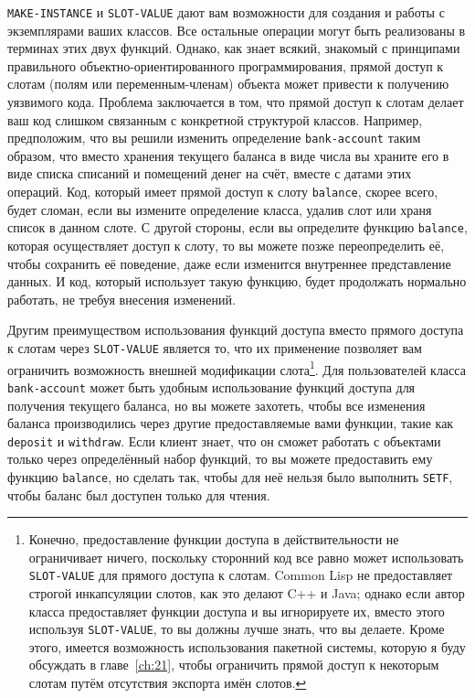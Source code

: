 \lstinline{MAKE-INSTANCE} и \lstinline{SLOT-VALUE} дают вам возможности для создания и работы с
экземплярами ваших классов.  Все остальные операции могут быть реализованы в терминах этих
двух функций.  Однако, как знает всякий, знакомый с принципами правильного
объектно-ориентированного программирования, прямой доступ к слотам (полям или
переменным-членам) объекта может привести к получению уязвимого кода.  Проблема
заключается в том, что прямой доступ к слотам делает ваш код слишком связанным с
конкретной структурой классов.  Например, предположим, что вы решили изменить определение
\lstinline{bank-account} таким образом, что вместо хранения текущего баланса в виде числа вы
храните его в виде списка списаний и помещений денег на счёт, вместе с датами этих
операций.  Код, который имеет прямой доступ к слоту \lstinline{balance}, скорее всего, будет
сломан, если вы измените определение класса, удалив слот или храня список в данном
слоте. С другой стороны, если вы определите функцию \lstinline{balance}, которая осуществляет
доступ к слоту, то вы можете позже переопределить её, чтобы сохранить её поведение, даже
если изменится внутреннее представление данных.  И код, который использует такую функцию,
будет продолжать нормально работать, не требуя внесения изменений.

Другим преимуществом использования функций доступа вместо прямого доступа к слотам через
\lstinline{SLOT-VALUE} является то, что их применение позволяет вам ограничить возможность
внешней модификации слота\footnote{Конечно, предоставление функции доступа в
  действительности не ограничивает ничего, поскольку сторонний код все равно может
  использовать \lstinline{SLOT-VALUE} для прямого доступа к слотам. Common Lisp не
  предоставляет строгой инкапсуляции слотов, как это делают C++ и Java; однако если автор
  класса предоставляет функции доступа и вы игнорируете их, вместо этого используя
  \lstinline{SLOT-VALUE}, то вы должны лучше знать, что вы делаете.  Кроме этого, имеется
  возможность использования пакетной системы, которую я буду обсуждать в
  главе~\ref{ch:21}, чтобы ограничить прямой доступ к некоторым слотам путём отсутствия
экспорта имён слотов.}. Для пользователей класса \lstinline{bank-account} может быть удобным
использование функций доступа для получения текущего баланса, но вы можете захотеть, чтобы
все изменения баланса производились через другие предоставляемые вами функции, такие как
\lstinline{deposit} и \lstinline{withdraw}.  Если клиент знает, что он сможет работать с объектами
только через определённый набор функций, то вы можете предоставить ему функцию
\lstinline{balance}, но сделать так, чтобы для неё нельзя было выполнить \lstinline{SETF}, чтобы
баланс был доступен только для чтения.

